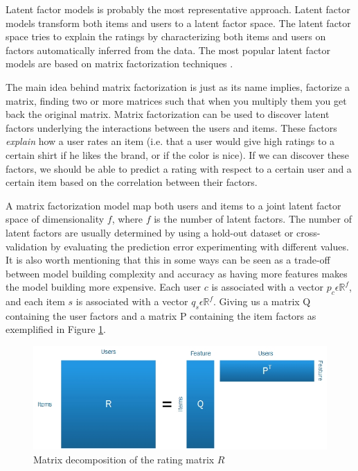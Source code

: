 Latent factor models is probably the most representative approach. Latent
factor models transform both items and users to a latent factor space. The
latent factor space tries to explain the ratings by characterizing both items
and users on factors automatically inferred from the data. The most popular
latent factor models are based on matrix factorization techniques
\cite{Koren2009}.

The main idea behind matrix factorization is just as its name implies,
factorize a matrix, finding two or more matrices such that when you multiply
them you get back the original matrix. Matrix factorization can be used to
discover latent factors underlying the interactions between the users and
items. These factors \emph{explain} how a user rates an item (i.e. that a user
would give high ratings to a certain shirt if he likes the brand, or if the
color is nice). If we can discover these factors, we should be able to predict
a rating with respect to a certain user and a certain item based on the
correlation between their factors.

A matrix factorization model map both users and items to a joint latent factor
space of dimensionality $f$, where $f$ is the number of latent factors. The
number of latent factors are usually determined by using a hold-out dataset or
cross-validation by evaluating the prediction error experimenting with
different values. It is also worth mentioning that this in some ways can be
seen as a trade-off between model building complexity and accuracy as having
more features makes the model building more expensive. Each user $c$ is
associated with a vector $p_{c} \epsilon \mathbb{R}^{f}$, and each item $s$ is
associated with a vector $q_{s} \epsilon \mathbb{R}^{f}$. Giving us a matrix Q
containing the user factors and a matrix P containing the item factors as
exemplified in Figure \ref{figure:matrixdecomp}.

\begin{figure}[H]
    \includegraphics[width=5in]{image/matrixdecomp.jpg}
    \centering
    \caption[Matrix decomposition of the rating matrix $R$]{Matrix
    decomposition of the rating matrix $R$}
    \label{figure:matrixdecomp}
\end{figure}

